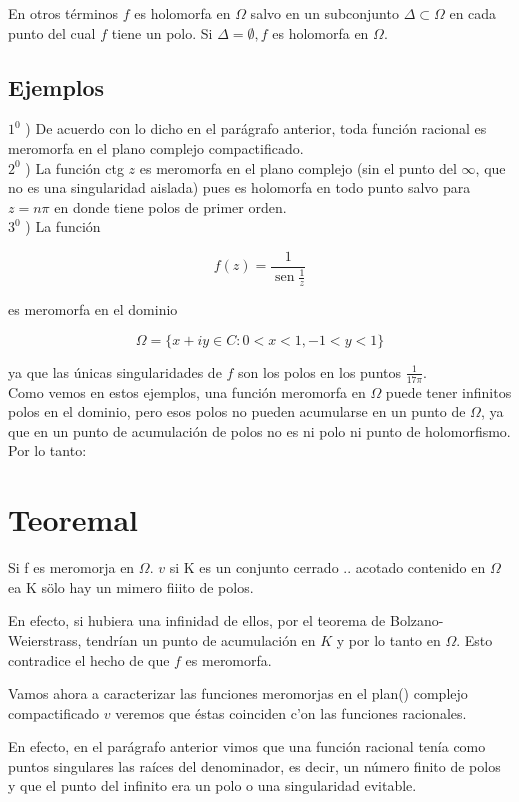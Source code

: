 \documentclass[10pt]{article}
\theoremstyle{plain}
\theoremstyle{definition}
\theoremstyle{remark}
\begin{document}
En otros términos $f$ es holomorfa en $\Omega$ salvo en un subconjunto $\Delta \subset \Omega$ en cada punto del cual $f$ tiene un polo. Si $\Delta=\emptyset, f$ es holomorfa en $\Omega$.

\subsection*{Ejemplos}
$1^{0}$ ) De acuerdo con lo dicho en el parágrafo anterior, toda función racional es meromorfa en el plano complejo compactificado.\\
$2^{0}$ ) La función ctg $z$ es meromorfa en el plano complejo (sin el punto del $\infty$, que no es una singularidad aislada) pues es holomorfa en todo punto salvo para $z=n \pi$ en donde tiene polos de primer orden.\\
$3^{0}$ ) La función

$$
f(z)=\frac{1}{\operatorname{sen} \frac{1}{z}}
$$

es meromorfa en el dominio

$$
\Omega=\{x+i y \in C: 0<x<1,-1<y<1\}
$$

ya que las únicas singularidades de $f$ son los polos en los puntos $\frac{1}{17 \pi}$.\\
Como vemos en estos ejemplos, una función meromorfa en $\Omega$ puede tener infinitos polos en el dominio, pero esos polos no pueden acumularse en un punto de $\Omega$, ya que en un punto de acumulación de polos no es ni polo ni punto de holomorfismo. Por lo tanto:

\section*{Teoremal}
Si f es meromorja en $\Omega$. $v$ si K es un conjunto cerrado .. acotado contenido en $\Omega$ ea K sölo hay un mimero fiiito de polos.

En efecto, si hubiera una infinidad de ellos, por el teorema de Bolzano-Weierstrass, tendrían un punto de acumulación en $K$ y por lo tanto en $\Omega$. Esto contradice el hecho de que $f$ es meromorfa.

Vamos ahora a caracterizar las funciones meromorjas en el plan() complejo compactificado $v$ veremos que éstas coinciden c'on las funciones racionales.

En efecto, en el parágrafo anterior vimos que una función racional tenía como puntos singulares las raíces del denominador, es decir, un número finito de polos y que el punto del infinito era un polo o una singularidad evitable.
\end{document}
